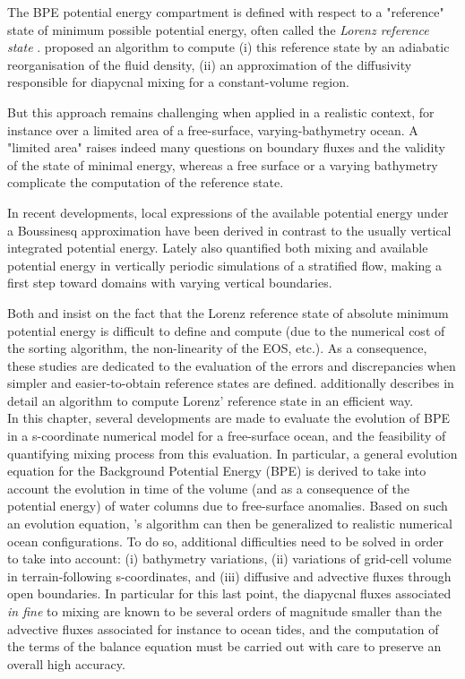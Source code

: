 The BPE potential energy compartment is defined with respect to a "reference" state of minimum possible potential energy, often called the \textit{Lorenz reference state} \citep{saenz_estimating_2015}. \cite{winters_available_1995} proposed an algorithm to compute (i) this reference state by an adiabatic reorganisation of the fluid density, (ii) an approximation of the diffusivity responsible for diapycnal mixing for a constant-volume region.


But this approach remains challenging when applied in a realistic context, for instance over a limited area of a free-surface, varying-bathymetry ocean. A "limited area" raises indeed many questions on boundary fluxes and the validity of the state of minimal energy, whereas a free surface or a varying bathymetry complicate the computation of the reference state.


In recent developments, local expressions of the available potential energy under a Boussinesq approximation have been derived \citep{winters_available_2013} in contrast to the usually vertical integrated potential energy. Lately \cite{howland_mixing_2020,howland_quantifying_2020} also quantified both mixing and available potential energy in vertically periodic simulations of a stratified flow, making a first step toward domains with varying vertical boundaries. 

Both \cite{saenz_estimating_2015} and \cite{tailleux_local_2018} insist on the fact that the Lorenz reference state of absolute minimum potential energy is difficult to define and compute (due to the numerical cost of the sorting algorithm, the non-linearity of the EOS, etc.). As a consequence, these studies are dedicated to the evaluation of the errors and discrepancies when simpler and easier-to-obtain reference states are defined.  \cite{saenz_estimating_2015} additionally describes in detail an algorithm to compute Lorenz' reference state in an efficient way.\\

In this chapter, several developments are made to evaluate the evolution of BPE in a s-coordinate numerical model for a free-surface ocean, \color{red}and the feasibility of quantifying mixing process from this evaluation\color{black}. In particular, a general evolution equation for the Background Potential Energy (BPE) is derived to take into account the evolution in time of the volume (and as a consequence of the potential energy) of water columns due to free-surface anomalies.
Based on such an evolution equation, \cite{winters_available_1995}'s algorithm can then be generalized to realistic numerical ocean configurations. To do so, additional difficulties need to be solved in order to take into account: (i) bathymetry variations, (ii) variations of grid-cell volume in terrain-following s-coordinates, and (iii) diffusive and advective fluxes through open boundaries. In particular for this last point, the diapycnal fluxes associated \textit{in fine} to mixing are known to be several orders of magnitude smaller than the advective fluxes associated for instance to ocean tides, and the computation of the terms of the balance equation must be carried out with care to preserve an overall high accuracy.

